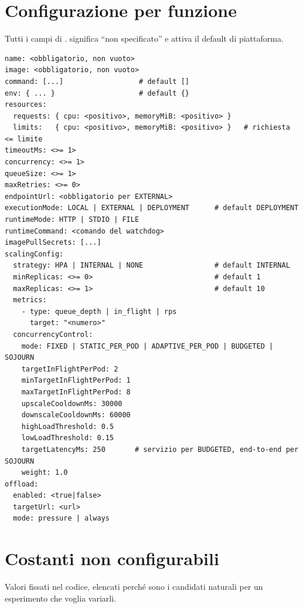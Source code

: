 \section{Configurazione per funzione}

Tutti i campi di .  significa ``non specificato'' e
attiva il default di piattaforma.

\begin{lstlisting}[language=yamlnf]
name: <obbligatorio, non vuoto>
image: <obbligatorio, non vuoto>
command: [...]                  # default []
env: { ... }                    # default {}
resources:
  requests: { cpu: <positivo>, memoryMiB: <positivo> }
  limits:   { cpu: <positivo>, memoryMiB: <positivo> }   # richiesta <= limite
timeoutMs: <>= 1>
concurrency: <>= 1>
queueSize: <>= 1>
maxRetries: <>= 0>
endpointUrl: <obbligatorio per EXTERNAL>
executionMode: LOCAL | EXTERNAL | DEPLOYMENT      # default DEPLOYMENT
runtimeMode: HTTP | STDIO | FILE
runtimeCommand: <comando del watchdog>
imagePullSecrets: [...]
scalingConfig:
  strategy: HPA | INTERNAL | NONE                 # default INTERNAL
  minReplicas: <>= 0>                             # default 1
  maxReplicas: <>= 1>                             # default 10
  metrics:
    - type: queue_depth | in_flight | rps
      target: "<numero>"
  concurrencyControl:
    mode: FIXED | STATIC_PER_POD | ADAPTIVE_PER_POD | BUDGETED | SOJOURN
    targetInFlightPerPod: 2
    minTargetInFlightPerPod: 1
    maxTargetInFlightPerPod: 8
    upscaleCooldownMs: 30000
    downscaleCooldownMs: 60000
    highLoadThreshold: 0.5
    lowLoadThreshold: 0.15
    targetLatencyMs: 250       # servizio per BUDGETED, end-to-end per SOJOURN
    weight: 1.0
offload:
  enabled: <true|false>
  targetUrl: <url>
  mode: pressure | always
\end{lstlisting}

\section{Costanti non configurabili}

Valori fissati nel codice, elencati perch\'e sono i candidati naturali per un
esperimento che voglia variarli.

